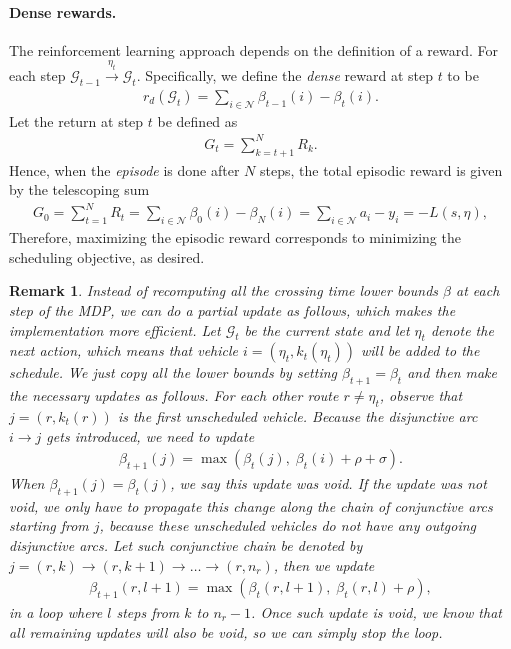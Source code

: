 \documentclass[a4paper]{report}
\theoremstyle{definition}
\theoremstyle{plain}
\newtheorem{remark}{Remark}[chapter]
\begin{document}
\paragraph{Dense rewards.}
The reinforcement learning approach depends on the definition of a reward. For
each step $\mathcal{G}_{t-1} \xrightarrow{\eta_{t}} \mathcal{G}_{t}$.
Specifically, we define the \emph{dense} reward at step $t$ to be
\begin{align*}
  r_d(\mathcal{G}_t) = \sum_{i \in \mathcal{N}} \beta_{t-1}(i) - \beta_{t}(i) .
\end{align*}
Let the return at step $t$ be defined as
\begin{align*}
  G_{t} = \sum_{k=t + 1}^{N} R_{k} .
\end{align*}
Hence, when the \textit{episode} is done after $N$ steps, the total episodic
reward is given by the telescoping sum
\begin{align*}
  G_{0} = \sum_{t=1}^{N} R_{t} = \sum_{i \in \mathcal{N}} \beta_{0}(i) - \beta_{N}(i)  = \sum_{i \in \mathcal{N}} a_{i} - y_{i} = - L(s, \eta) ,
\end{align*}
Therefore, maximizing the episodic reward corresponds to minimizing the
scheduling objective, as desired.

\begin{remark}
  Instead of recomputing all the crossing time lower bounds $\beta$ at each step
  of the MDP, we can do a partial update as follows, which makes the
  implementation more efficient.
  Let $\mathcal{G}_t$ be the current state and let $\eta_t$ denote the next
  action, which means that vehicle $i = (\eta_t, k_t(\eta_t))$ will be added to
  the schedule.
  We just copy all the lower bounds by setting $\beta_{t+1} = \beta_t$ and then
  make the necessary updates as follows.
  For each other route $r \neq \eta_t$, observe that $j = (r, k_t(r))$ is the
  first unscheduled vehicle. Because the disjunctive arc $i \rightarrow j$ gets
  introduced, we need to update
  \begin{align*}
    \beta_{t+1}(j) = \max(\beta_t(j), \; \beta_t(i) + \rho + \sigma ) .
  \end{align*}
  When $\beta_{t+1}(j) = \beta_t(j)$, we say this update was void. If the update
  was not void, we only have to propagate this change along the chain of
  conjunctive arcs starting from $j$, because these unscheduled vehicles do not
  have any outgoing disjunctive arcs. Let such conjunctive chain be denoted by
  $j = (r,k) \rightarrow (r,k+1) \rightarrow \dots \rightarrow (r,n_r)$, then we
  update
  \begin{align*}
    \beta_{t+1}(r,l + 1) = \max(\beta_t(r,l + 1) , \; \beta_t(r,l) + \rho) ,
  \end{align*}
  in a loop where $l$ steps from $k$ to $n_r - 1$. Once such update is void, we
  know that all remaining updates will also be void, so we can simply stop the
  loop.
\end{remark}
\end{document}
